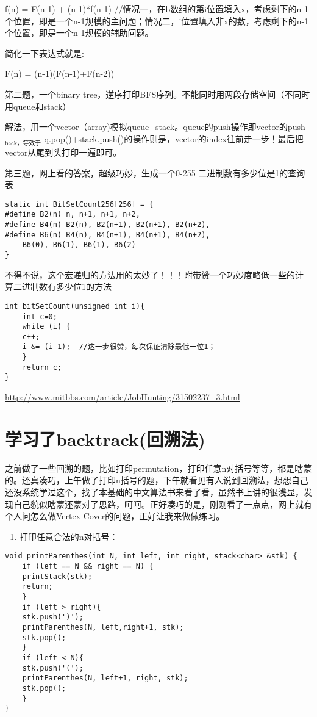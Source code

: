 \documentclass[12pt]{book}
\begin{document}
f(n) = F(n-1) + (n-1)*f(n-1)   //情况一，在b数组的第i位置填入x，考虑剩下的n-1个位置，即是一个n-1规模的主问题；情况二，i位置填入非x的数，考虑剩下的n-1个位置，即是一个n-1规模的辅助问题。

简化一下表达式就是:

F(n) = (n-1)(F(n-1)+F(n-2))

第二题，一个binary tree，逆序打印BFS序列。不能同时用两段存储空间（不同时用queue和stack）

解法，用一个vector（array)模拟queue+stack。queue的push操作即vector的push$_{\text{back，等效于}}$ q.pop()+stack.push()的操作则是，vector的index往前走一步！最后把vector从尾到头打印一遍即可。

第三题，网上看的答案，超级巧妙，生成一个0-255 二进制数有多少位是1的查询表
\lstset{language=java,label= ,caption= ,numbers=none}
\begin{lstlisting}
static int BitSetCount256[256] = {
#define B2(n) n, n+1, n+1, n+2,
#define B4(n) B2(n), B2(n+1), B2(n+1), B2(n+2),
#define B6(n) B4(n), B4(n+1), B4(n+1), B4(n+2),
    B6(0), B6(1), B6(1), B6(2)
}
\end{lstlisting}

不得不说，这个宏递归的方法用的太妙了！！！附带赞一个巧妙度略低一些的计
算二进制数有多少位1的方法
\lstset{language=java,label= ,caption= ,numbers=none}
\begin{lstlisting}
int bitSetCount(unsigned int i){
    int c=0;
    while (i) {
	c++;
	i &= (i-1);  //这一步很赞，每次保证清除最低一位1；
    }
    return c;
}
\end{lstlisting}

\url{http://www.mitbbs.com/article/JobHunting/31502237_3.html}

\section{学习了backtrack(回溯法)}
\label{sec-18-3}

之前做了一些回溯的题，比如打印permutation，打印任意n对括号等等，都是瞎蒙的。还真凑巧，上午做了打印n括号的题，下午就看见有人说到回溯法，想想自己还没系统学过这个，找了本基础的中文算法书来看了看，虽然书上讲的很浅显，发现自己貌似瞎蒙还蒙对了思路，呵呵。正好凑巧的是，刚刚看了一点点，网上就有个人问怎么做Vertex Cover的问题，正好让我来做做练习。

\begin{enumerate}
\item 打印任意合法的n对括号：
\end{enumerate}
\lstset{language=java,label= ,caption= ,numbers=none}
\begin{lstlisting}
void printParenthes(int N, int left, int right, stack<char> &stk) {
    if (left == N && right == N) {
	printStack(stk);
	return;
    }
    if (left > right){
	stk.push(')');
	printParenthes(N, left,right+1, stk);
	stk.pop();
    }
    if (left < N){
	stk.push('(');
	printParenthes(N, left+1, right, stk);
	stk.pop();
    }   
}
\end{lstlisting}
\end{document}
